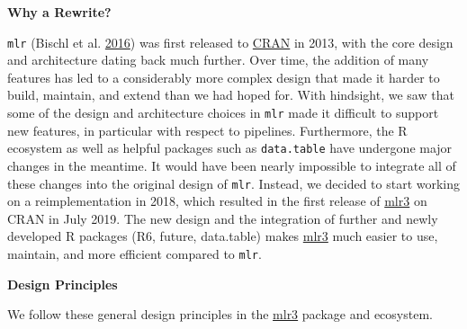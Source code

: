 \documentclass[
  11pt,
  parskip=half,
  DIV=calc,
  BCOR=10mm,
  x11names]{scrbook}
\begin{document}
\textbf{Why a Rewrite?}

\texttt{mlr} (Bischl et al. \protect\hyperlink{ref-mlr}{2016}) was first released to \href{https://cran.r-project.org}{CRAN} in 2013, with the core design and architecture dating back much further.
Over time, the addition of many features has led to a considerably more complex design that made it harder to build, maintain, and extend than we had hoped for.
With hindsight, we saw that some of the design and architecture choices in \texttt{mlr} made it difficult to support new features, in particular with respect to pipelines.
Furthermore, the R ecosystem as well as helpful packages such as \texttt{data.table} have undergone major changes in the meantime.
It would have been nearly impossible to integrate all of these changes into the original design of \texttt{mlr}.
Instead, we decided to start working on a reimplementation in 2018, which resulted in the first release of \href{https://mlr3.mlr-org.com}{mlr3} on CRAN in July 2019.
The new design and the integration of further and newly developed R packages (R6, future, data.table) makes \href{https://mlr3.mlr-org.com}{mlr3} much easier to use, maintain, and more efficient compared to \texttt{mlr}.

\textbf{Design Principles}

We follow these general design principles in the \href{https://mlr3.mlr-org.com}{mlr3} package and ecosystem.
\end{document}
